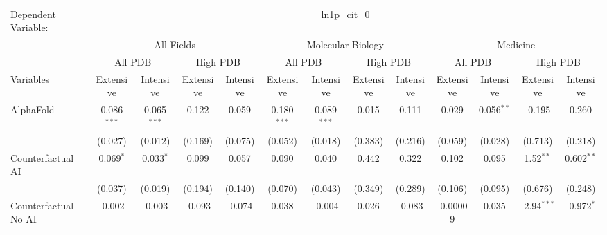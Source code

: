 \begingroup
\centering
\begin{tabular}{lcccccccccccc}
   \tabularnewline \midrule \midrule
   Dependent Variable: & \multicolumn{12}{c}{ln1p\_cit\_0}\\
 & \multicolumn{4}{c}{All Fields} & \multicolumn{4}{c}{Molecular Biology} & \multicolumn{4}{c}{Medicine} \\
\cmidrule(lr){2-5} \cmidrule(lr){6-9} \cmidrule(lr){10-13}
 & \multicolumn{2}{c}{All PDB} & \multicolumn{2}{c}{High PDB} & \multicolumn{2}{c}{All PDB} & \multicolumn{2}{c}{High PDB} & \multicolumn{2}{c}{All PDB} & \multicolumn{2}{c}{High PDB} \\
\cmidrule(lr){2-3} \cmidrule(lr){4-5} \cmidrule(lr){6-7} \cmidrule(lr){8-9} \cmidrule(lr){10-11} \cmidrule(lr){12-13}
Variables & \multicolumn{1}{c}{Extensive} & \multicolumn{1}{c}{Intensive} & \multicolumn{1}{c}{Extensive} & \multicolumn{1}{c}{Intensive} & \multicolumn{1}{c}{Extensive} & \multicolumn{1}{c}{Intensive} & \multicolumn{1}{c}{Extensive} & \multicolumn{1}{c}{Intensive} & \multicolumn{1}{c}{Extensive} & \multicolumn{1}{c}{Intensive} & \multicolumn{1}{c}{Extensive} & \multicolumn{1}{c}{Intensive} \\
\cmidrule(lr){1-1}\cmidrule(lr){2-2} \cmidrule(lr){3-3} \cmidrule(lr){4-4} \cmidrule(lr){5-5} \cmidrule(lr){6-6} \cmidrule(lr){7-7} \cmidrule(lr){8-8} \cmidrule(lr){9-9} \cmidrule(lr){10-10} \cmidrule(lr){11-11} \cmidrule(lr){12-12} \cmidrule(lr){13-13}
   AlphaFold                                & 0.086$^{***}$ & 0.065$^{***}$ & 0.122       & 0.059        & 0.180$^{***}$ & 0.089$^{***}$ & 0.015        & 0.111         & 0.029        & 0.056$^{**}$ & -0.195        & 0.260\\   
                                            & (0.027)       & (0.012)       & (0.169)     & (0.075)      & (0.052)       & (0.018)       & (0.383)      & (0.216)       & (0.059)      & (0.028)      & (0.713)       & (0.218)\\   
   Counterfactual AI                        & 0.069$^{*}$   & 0.033$^{*}$   & 0.099       & 0.057        & 0.090         & 0.040         & 0.442        & 0.322         & 0.102        & 0.095        & 1.52$^{**}$   & 0.602$^{**}$\\   
                                            & (0.037)       & (0.019)       & (0.194)     & (0.140)      & (0.070)       & (0.043)       & (0.349)      & (0.289)       & (0.106)      & (0.095)      & (0.676)       & (0.248)\\   
   Counterfactual No AI                     & -0.002        & -0.003        & -0.093      & -0.074       & 0.038         & -0.004        & 0.026        & -0.083        & -0.00009     & 0.035        & -2.94$^{***}$ & -0.972$^{*}$\\   

\end{tabular}
